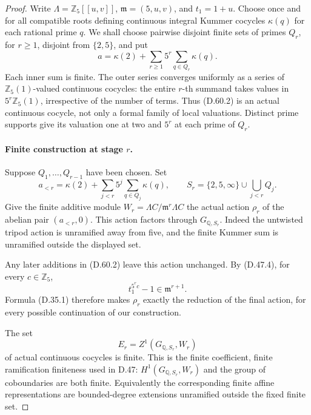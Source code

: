 \begin{proof}
Write \(\Lambda=\mathbb Z_5[[u,v]]\),
\(\mathfrak m=(5,u,v)\), and \(t_1=1+u\).
Choose once and for all compatible roots defining continuous
integral Kummer cocycles \(\kappa(q)\) for each rational prime
\(q\). We shall choose pairwise disjoint finite sets of primes
\(Q_r\), for \(r\ge1\), disjoint from \(\{2,5\}\), and put
\[
 a=\kappa(2)+\sum_{r\ge1}5^r\sum_{q\in Q_r}\kappa(q).
                                                        \tag{D.60.2}
\]
Each inner sum is finite. The outer series converges uniformly
as a series of \(\mathbb Z_5(1)\)-valued continuous cocycles:
the entire \(r\)-th summand takes values in
\(5^r\mathbb Z_5(1)\), irrespective of the number of terms.
Thus (D.60.2) is an actual continuous cocycle, not only a formal
family of local valuations. Distinct prime supports give its
valuation one at two and \(5^r\) at each prime of \(Q_r\).

\paragraph{Finite construction at stage \(r\).}
Suppose \(Q_1,\ldots,Q_{r-1}\) have been chosen. Set
\[
 a_{<r}=\kappa(2)+
       \sum_{j<r}5^j\sum_{q\in Q_j}\kappa(q),\qquad
 S_r=\{2,5,\infty\}\cup\bigcup_{j<r}Q_j .
                                                        \tag{D.60.3}
\]
Give the finite additive module
\(W_r=\Lambda C/\mathfrak m^r\Lambda C\)
the actual action \(\rho_r\) of the abelian pair
\((a_{<r},0)\). This action factors through
\(G_{\mathbb Q,S_r}\). Indeed the untwisted tripod action is
unramified away from five, and the finite Kummer sum is
unramified outside the displayed set.

Any later additions in (D.60.2) leave this action unchanged.
By (D.47.4), for every \(c\in\mathbb Z_5\),
\[
           t_1^{5^r c}-1\in\mathfrak m^{r+1}.
                                                        \tag{D.60.4}
\]
Formula (D.35.1) therefore makes \(\rho_r\) exactly the
reduction of the final action, for every possible continuation
of our construction.

The set
\[
             E_r=Z^1(G_{\mathbb Q,S_r},W_r)
                                                        \tag{D.60.5}
\]
of actual continuous cocycles is finite. This is the finite
coefficient, finite ramification finiteness used in D.47:
\(H^1(G_{\mathbb Q,S_r},W_r)\) and the group of coboundaries
are both finite. Equivalently the corresponding finite affine
representations are bounded-degree extensions unramified
outside the fixed finite set.


\end{proof}
